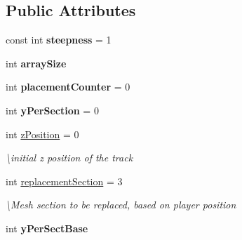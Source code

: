 \subsection*{Public Attributes}
\begin{DoxyCompactItemize}
\item 
\mbox{\label{class_a_track_generator_bezier_a7655f04c3a6c384567be7d335814100e}} 
const int {\bfseries steepness} = 1
\item 
\mbox{\label{class_a_track_generator_bezier_ad984ad4e3d1b9dce8866ff691b03cfa1}} 
int {\bfseries array\+Size}
\item 
\mbox{\label{class_a_track_generator_bezier_a309c7225418eef7520a98e6f91b35307}} 
int {\bfseries placement\+Counter} = 0
\item 
\mbox{\label{class_a_track_generator_bezier_a6812edb9f63ac27872dede8a8f7c5e16}} 
int {\bfseries y\+Per\+Section} = 0
\item 
\mbox{\label{class_a_track_generator_bezier_ad09f8b8abcd1149ee4eaf82a67f0d608}} 
int \mbox{\hyperlink{class_a_track_generator_bezier_ad09f8b8abcd1149ee4eaf82a67f0d608}{z\+Position}} = 0
\begin{DoxyCompactList}\small\item\em \textbackslash{}initial z position of the track \end{DoxyCompactList}\item 
\mbox{\label{class_a_track_generator_bezier_a03bd872cb140fca37bf573f05fd9393e}} 
int \mbox{\hyperlink{class_a_track_generator_bezier_a03bd872cb140fca37bf573f05fd9393e}{replacement\+Section}} = 3
\begin{DoxyCompactList}\small\item\em \textbackslash{}\+Mesh section to be replaced, based on player position \end{DoxyCompactList}\item 
\mbox{\label{class_a_track_generator_bezier_a395ab645fc6c70a1c97f8dac67da89d1}} 
int {\bfseries y\+Per\+Sect\+Base}
\item 

\end{DoxyCompactItemize}
